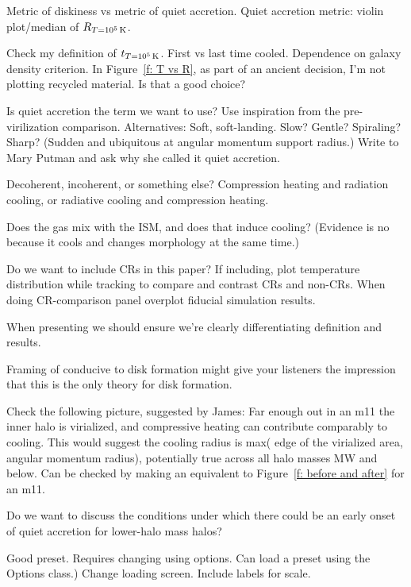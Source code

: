 \documentclass[fleqn,usenatbib]{mnras}
\newcommand{\Rcon}{R_{T=10^5\,{\rm K}}}
\newcommand{\tcon}{t_{T=10^5\,{\rm K}}}
\begin{document}
Metric of diskiness vs metric of quiet accretion.
Quiet accretion metric: violin plot/median of $\Rcon$.

Check my definition of $\tcon$.
First vs last time cooled.
Dependence on galaxy density criterion.
In Figure~\ref{f: T vs R}, as part of an ancient decision, I'm not plotting recycled material.
Is that a good choice?

Is quiet accretion the term we want to use?
Use inspiration from the pre-virilization comparison.
Alternatives:
Soft, soft-landing.
Slow?
Gentle?
Spiraling?
Sharp? (Sudden and ubiquitous at angular momentum support radius.)
Write to Mary Putman and ask why she called it quiet accretion.

Decoherent, incoherent, or something else?
Compression heating and radiation cooling, or radiative cooling and compression heating.

Does the gas mix with the ISM, and does that induce cooling? (Evidence is no because it cools and changes morphology at the same time.)

Do we want to include CRs in this paper?
If including, plot temperature distribution while tracking to compare and contrast CRs and non-CRs.
When doing CR-comparison panel overplot fiducial simulation results.

When presenting we should ensure we're clearly differentiating definition and results.

Framing of conducive to disk formation might give your listeners the impression that this is the only theory for disk formation.

Check the following picture, suggested by James:
Far enough out in an m11 the inner halo is virialized, and compressive heating can contribute comparably to cooling.
This would suggest the cooling radius is max( edge of the virialized area, angular momentum radius), potentially true across all halo masses MW and below.
Can be checked by making an equivalent to Figure~\ref{f: before and after} for an m11.


Do we want to discuss the conditions under which there could be an early onset of quiet accretion for lower-halo mass halos?

Good preset. Requires changing using options. Can load a preset using the Options class.)
Change loading screen.
Include labels for scale.
\end{document}
